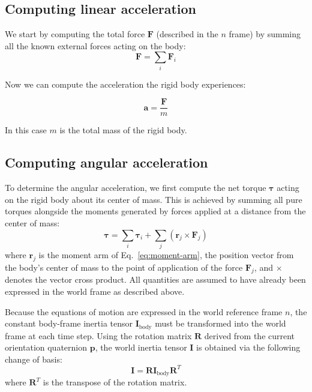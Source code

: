 \documentclass{article}
\begin{document}
	\subsection{Computing linear acceleration}
	
	We start by computing the total force $\mathbf{F}$ (described in the $n$ frame) by summing all the known external forces acting on the body:
	\begin{equation}
		\mathbf{F} = \sum_{i} \mathbf{F}_i
	\end{equation}
	
	Now we can compute the acceleration the rigid body experiences:
	
	$$\mathbf{a} = \frac{\mathbf{F}}{m}$$
	
	In this case $m$ is the total mass of the rigid body.
	
	\subsection{Computing angular acceleration}
	
	To determine the angular acceleration, we first compute the net torque $\boldsymbol{\tau}$ acting on the rigid body about its center of mass. This is achieved by summing all pure torques alongside the moments generated by forces applied at a distance from the center of mass:
	\begin{equation}
		\boldsymbol{\tau} = \sum_{i} \boldsymbol{\tau}_i + \sum_{j} \left( \mathbf{r}_j \times \mathbf{F}_j \right)
	\end{equation}
	where $\mathbf{r}_j$ is the moment arm of Eq.~\eqref{eq:moment-arm}, the position vector from the body's center of mass to the point of application of the force $\mathbf{F}_j$, and $\times$ denotes the vector cross product. All quantities are assumed to have already been expressed in the world frame as described above.
	
	Because the equations of motion are expressed in the world reference frame $n$, the constant body-frame inertia tensor $\mathbf{I}_{\text{body}}$ must be transformed into the world frame at each time step. Using the rotation matrix $\mathbf{R}$ derived from the current orientation quaternion $\mathbf{p}$, the world inertia tensor $\mathbf{I}$ is obtained via the following change of basis:
	\begin{equation}
		\mathbf{I} = \mathbf{R} \mathbf{I}_{\text{body}} \mathbf{R}^T
	\end{equation}
	where $\mathbf{R}^T$ is the transpose of the rotation matrix.
	
\end{document}
